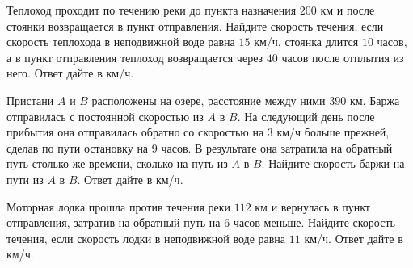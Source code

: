 \begin{class}[number=3]
\begin{listofex}
		\item Теплоход проходит по течению реки до пункта назначения \(200\) км и после стоянки возвращается в пункт отправления. Найдите скорость течения, если скорость теплохода в неподвижной воде равна \(15\) км/ч, стоянка длится \(10\) часов, а в пункт отправления теплоход возвращается через \(40\) часов после отплытия из него. Ответ дайте в км/ч.
		\item Пристани \(A\) и \(B\) расположены на озере, расстояние между ними \(390\) км. Баржа отправилась с постоянной скоростью из \(A\) в \(B\). На следующий день после прибытия она отправилась обратно со скоростью на \(3\) км/ч больше прежней, сделав по пути остановку на \(9\) часов. В результате она затратила на обратный путь столько же времени, сколько на путь из \(A\) в \(B\). Найдите скорость баржи на пути из \(A\) в \(B\). Ответ дайте в км/ч.
		\item Моторная лодка прошла против течения реки \(112\) км и вернулась в пункт отправления, затратив на обратный путь на \(6\) часов меньше. Найдите скорость течения, если скорость лодки в неподвижной воде равна \(11\) км/ч. Ответ дайте в км/ч.
	\end{listofex}
\end{class}


